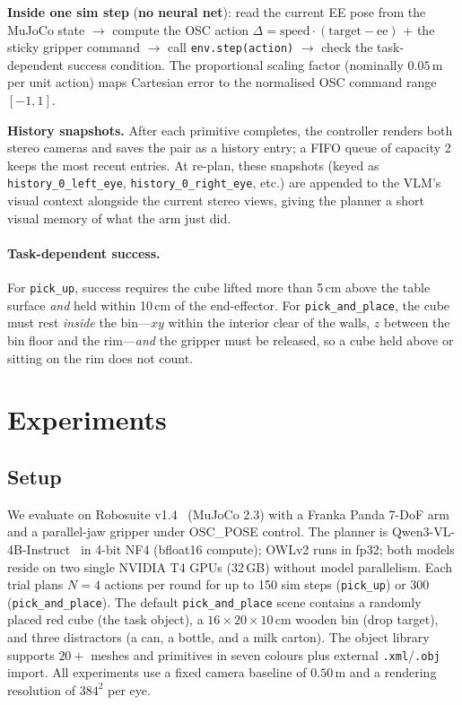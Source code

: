 \documentclass[conference]{IEEEtran}
\providecommand{\alert}[1]{\textbf{\textcolor{accent2}{#1}}}
\begin{document}
\textbf{Inside one sim step} (\alert{no neural net}): read the current EE pose from the MuJoCo state $\to$ compute the OSC action $\Delta=\text{speed}\cdot(\text{target}-\text{ee})$ $+$ the sticky gripper command $\to$ call \texttt{env.step(action)} $\to$ check the task-dependent success condition. The proportional scaling factor (nominally $0.05$\,m per unit action) maps Cartesian error to the normalised OSC command range $[-1,1]$.

\textbf{History snapshots.} After each primitive completes, the controller renders both stereo cameras and saves the pair as a history entry; a FIFO queue of capacity 2 keeps the most recent entries. At re-plan, these snapshots (keyed as \texttt{history\_0\_left\_eye}, \texttt{history\_0\_right\_eye}, etc.) are appended to the VLM's visual context alongside the current stereo views, giving the planner a short visual memory of what the arm just did.

\paragraph{Task-dependent success.}
For \texttt{pick\_up}, success requires the cube lifted more than 5\,cm above the table surface \emph{and} held within 10\,cm of the end-effector. For \texttt{pick\_and\_place}, the cube must rest \emph{inside} the bin---$xy$ within the interior clear of the walls, $z$ between the bin floor and the rim---\emph{and} the gripper must be released, so a cube held above or sitting on the rim does not count.

\section{Experiments}
\label{sec:exp}

\subsection{Setup}
\label{sec:setup}

We evaluate on Robosuite v1.4~\cite{robosuite} (MuJoCo 2.3) with a Franka Panda 7-DoF arm and a parallel-jaw gripper under OSC\_POSE control. The planner is Qwen3-VL-4B-Instruct~\cite{qwen3vl} in 4-bit NF4 (bfloat16 compute); OWLv2 runs in fp32; both models reside on two single NVIDIA T4 GPUs (32\,GB) without model parallelism. Each trial plans $N=4$ actions per round for up to 150 sim steps (\texttt{pick\_up}) or 300 (\texttt{pick\_and\_place}). The default \texttt{pick\_and\_place} scene contains a randomly placed red cube (the task object), a $16{\times}20{\times}10$\,cm wooden bin (drop target), and three distractors (a can, a bottle, and a milk carton). The object library supports $20+$ meshes and primitives in seven colours plus external \texttt{.xml}/\texttt{.obj} import. All experiments use a fixed camera baseline of $0.50$\,m and a rendering resolution of $384^2$ per eye.
\end{document}
